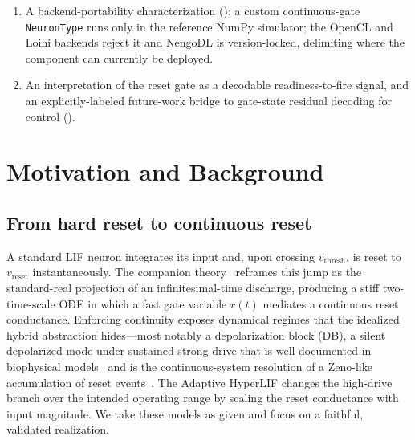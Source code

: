 \documentclass[11pt]{article}
\newcommand{\vth}{v_{\mathrm{thresh}}}
\newcommand{\vre}{v_{\mathrm{reset}}}
\newcommand{\code}[1]{\texttt{#1}}
\begin{document}
\begin{enumerate}
  (): the calibrated HyperLIF reset gate and
  combined state readouts carry decodable represented-signal information at much
  lower firing rates than native LIF.
  \item A backend-portability characterization
  (): a custom continuous-gate \code{NeuronType}
  runs only in the reference NumPy simulator; the OpenCL and Loihi backends
  reject it and NengoDL is version-locked, delimiting where the component can
  currently be deployed.
  \item An interpretation of the reset gate as a decodable readiness-to-fire
  signal, and an explicitly-labeled future-work bridge to gate-state residual
  decoding for control ().
\end{enumerate}

\section{Motivation and Background}\label{sec:background}
\subsection{From hard reset to continuous reset}
A standard LIF neuron integrates its input and, upon crossing $\vth$, is reset
to $\vre$ instantaneously. The companion theory~\cite{hyperlif_theory} reframes
this jump as the standard-real projection of an infinitesimal-time discharge,
producing a stiff two-time-scale ODE in which a fast gate variable $r(t)$
mediates a continuous reset conductance. Enforcing continuity exposes dynamical
regimes that the idealized hybrid abstraction hides---most notably a
depolarization block (DB), a silent depolarized mode under sustained strong
drive that is well documented in biophysical
models~\cite{bianchi2012db,dovzhenok2012db} and is the continuous-system
resolution of a Zeno-like accumulation of reset events~\cite{zhang2001zeno}. The
Adaptive HyperLIF changes the high-drive branch over the intended operating range by
scaling the reset conductance with input magnitude. We take these models as
given and focus on a faithful, validated realization.
\end{document}
